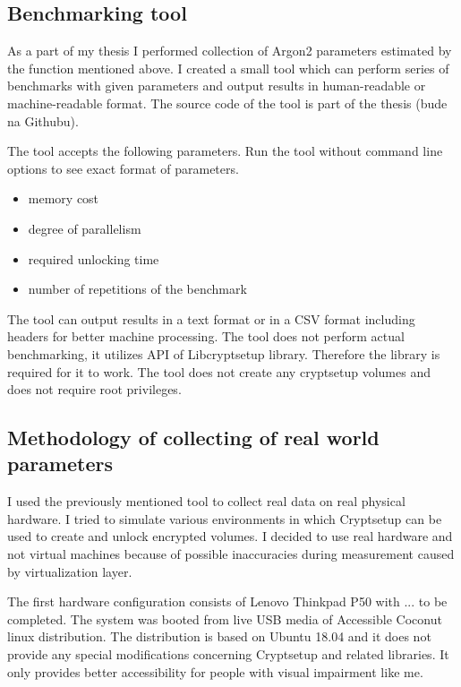 \documentclass[nolof]{fithesis3}
\begin{document}
\subsection{Benchmarking tool}
As a part of my thesis I performed collection of Argon2 parameters estimated by the function mentioned above. I created a small tool which can perform series of benchmarks with given parameters and output results in human-readable or machine-readable format. The source code of the tool is part of the thesis (bude na Githubu).

The tool accepts the following parameters. Run the tool without command line options to see exact format of parameters.

\begin{itemize}
\item memory cost

\item degree of parallelism

\item required unlocking time

\item number of repetitions of the benchmark
\end{itemize}

The tool can output results in a text format or in a CSV format including headers for better machine processing. The tool does not perform actual benchmarking, it utilizes API of Libcryptsetup library. Therefore the library is required for it to work. The tool does not create any cryptsetup volumes and does not require root privileges.

\subsection{Methodology of collecting of real world parameters}
I used the previously mentioned tool to collect real data on real physical hardware. I tried to simulate various environments in which Cryptsetup can be used to create and unlock encrypted volumes. I decided to use real hardware and not virtual machines because of possible inaccuracies during measurement caused by virtualization layer.

The first hardware configuration consists of Lenovo Thinkpad P50 with ... to be completed. The system was booted from live USB media of Accessible Coconut linux distribution. The distribution is based on Ubuntu 18.04 and it does not provide any special modifications concerning Cryptsetup and related libraries. It only provides better accessibility for people with visual impairment like me.
\end{document}
